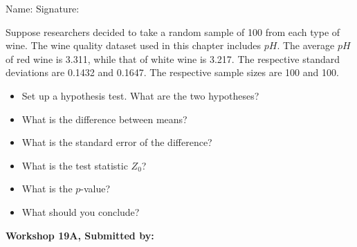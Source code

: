 \documentclass[11pt, chapterprefix=true]{scrbook}\usepackage[]{graphicx}\usepackage[]{color}
\begin{document}
\begin{exercises}
\begin{exercise}
\begin{center}
{{\vspace{4mm}
Name: \underline{\phantom{xxxxxxxxxxxxxxxxxxxxxxxx}} Signature: \underline{\phantom{xxxxxxxxxxxxxxxxxxxxxxxx}}
 }}
\end{center}   %

Suppose researchers decided to take a random sample of 100 from each type of wine.  The wine quality dataset used in this chapter includes $pH$. The average $pH$ of red wine is 3.311, while that of white wine is 3.217. The respective standard deviations are 0.1432 and 0.1647. The respective sample sizes are 100 and 100.

\begin{itemize}
  \item Set up a hypothesis test. What are the two hypotheses?
  \item What is the difference between means?
  \item What is the standard error of the difference?
  \item What is the test statistic $Z_0$?
  \item What is the $p$-value?
  \item What should you conclude?
\end{itemize}

\end{exercise} 
\begin{solution}  %


\end{solution}


\clearpage

    \begin{exercise}  %

    \begin{center}
\begin{flushleft}\textbf{\large \hfill Workshop 19A, Submitted by: }\end{flushleft}


\end{center}
\end{exercise}
\end{exercises}
\end{document}

